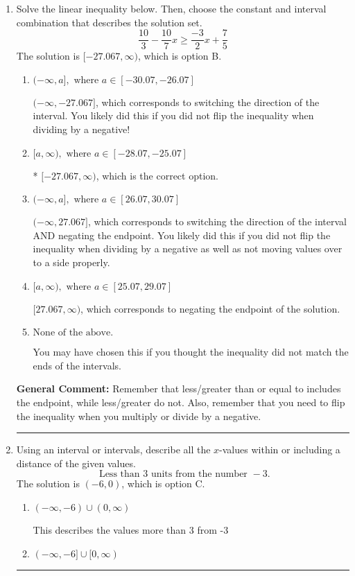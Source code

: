 \documentclass{extbook}[14pt]
\newcommand{\litem}[1]{\item #1

\rule{\textwidth}{0.4pt}}
\begin{document}
\begin{enumerate}\litem{
Solve the linear inequality below. Then, choose the constant and interval combination that describes the solution set.
\[ \frac{10}{3} - \frac{10}{7} x \geq \frac{-3}{2} x + \frac{7}{5} \]The solution is \( [-27.067, \infty) \), which is option B.\begin{enumerate}[label=\Alph*.]
\item \( (-\infty, a], \text{ where } a \in [-30.07, -26.07] \)

 $(-\infty, -27.067]$, which corresponds to switching the direction of the interval. You likely did this if you did not flip the inequality when dividing by a negative!
\item \( [a, \infty), \text{ where } a \in [-28.07, -25.07] \)

* $[-27.067, \infty)$, which is the correct option.
\item \( (-\infty, a], \text{ where } a \in [26.07, 30.07] \)

 $(-\infty, 27.067]$, which corresponds to switching the direction of the interval AND negating the endpoint. You likely did this if you did not flip the inequality when dividing by a negative as well as not moving values over to a side properly.
\item \( [a, \infty), \text{ where } a \in [25.07, 29.07] \)

 $[27.067, \infty)$, which corresponds to negating the endpoint of the solution.
\item \( \text{None of the above}. \)

You may have chosen this if you thought the inequality did not match the ends of the intervals.
\end{enumerate}

\textbf{General Comment:} Remember that less/greater than or equal to includes the endpoint, while less/greater do not. Also, remember that you need to flip the inequality when you multiply or divide by a negative.
}
\litem{
Using an interval or intervals, describe all the $x$-values within or including a distance of the given values.
\[ \text{ Less than } 3 \text{ units from the number } -3. \]The solution is \( (-6, 0) \), which is option C.\begin{enumerate}[label=\Alph*.]
\item \( (-\infty, -6) \cup (0, \infty) \)

This describes the values more than 3 from -3
\item \( (-\infty, -6] \cup [0, \infty) \)


\end{enumerate}}
\end{enumerate}
\end{document}

